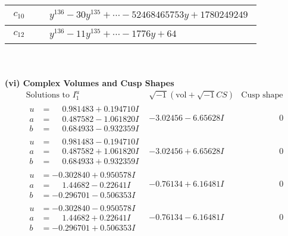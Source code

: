 \documentclass[1p]{elsarticle_modified}
\theoremstyle{definition}
\newcommand{\I}{\sqrt{-1}}
\begin{document}
\begin{tabular}{m{50pt}|m{274pt}}
\hline $$\begin{aligned}c_{10}\end{aligned}$$&$\begin{aligned}
&y^{136}-30 y^{135}+\cdots-52468465753 y+1780249249
\end{aligned}$\\
\hline $$\begin{aligned}c_{12}\end{aligned}$$&$\begin{aligned}
&y^{136}-11 y^{135}+\cdots-1776 y+64
\end{aligned}$\\
\hline
\end{tabular}\\~\\
\newpage\flushleft \textbf{(vi) Complex Volumes and Cusp Shapes}
$$\begin{array}{c|c|c}  
\text{Solutions to }I^u_{1}& \I (\text{vol} + \sqrt{-1}CS) & \text{Cusp shape}\\
 \hline 
\begin{aligned}
u &= \phantom{-}0.981483 + 0.194710 I \\
a &= \phantom{-}0.487582 - 1.061820 I \\
b &= \phantom{-}0.684933 - 0.932359 I\end{aligned}
 & -3.02456 - 6.65628 I & \phantom{-0.000000 } 0 \\ \hline\begin{aligned}
u &= \phantom{-}0.981483 - 0.194710 I \\
a &= \phantom{-}0.487582 + 1.061820 I \\
b &= \phantom{-}0.684933 + 0.932359 I\end{aligned}
 & -3.02456 + 6.65628 I & \phantom{-0.000000 } 0 \\ \hline\begin{aligned}
u &= -0.302840 + 0.950578 I \\
a &= \phantom{-}1.44682 - 0.22641 I \\
b &= -0.296701 - 0.506353 I\end{aligned}
 & -0.76134 + 6.16481 I & \phantom{-0.000000 } 0 \\ \hline\begin{aligned}
u &= -0.302840 - 0.950578 I \\
a &= \phantom{-}1.44682 + 0.22641 I \\
b &= -0.296701 + 0.506353 I\end{aligned}
 & -0.76134 - 6.16481 I & \phantom{-0.000000 } 0 \\ \hline\begin{aligned}

\end{aligned}
\end{array}$$
\end{document}
